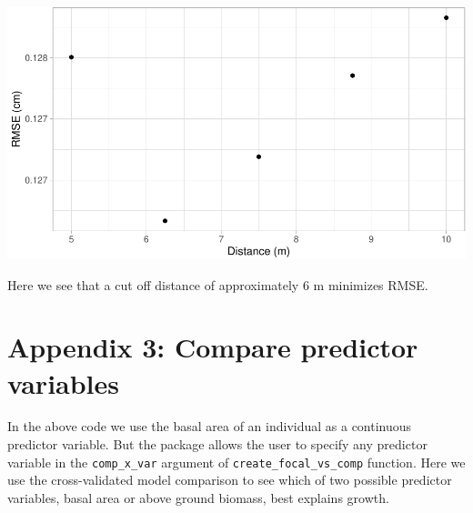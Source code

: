 \documentclass[12pt]{article}
\begin{document}
\begin{center}\includegraphics[width=1\linewidth]{Figures/appendix2-code-1} \end{center}

Here we see that a cut off distance of approximately 6 m minimizes RMSE.

\hypertarget{compare-pred-var}{%
\section{Appendix 3: Compare predictor
variables}\label{compare-pred-var}}

In the above code we use the basal area of an individual as a continuous
predictor variable. But the package allows the user to specify any
predictor variable in the \texttt{comp\_x\_var} argument of
\texttt{create\_focal\_vs\_comp} function. Here we use the
cross-validated model comparison to see which of two possible predictor
variables, basal area or above ground biomass, best explains growth.
\end{document}
